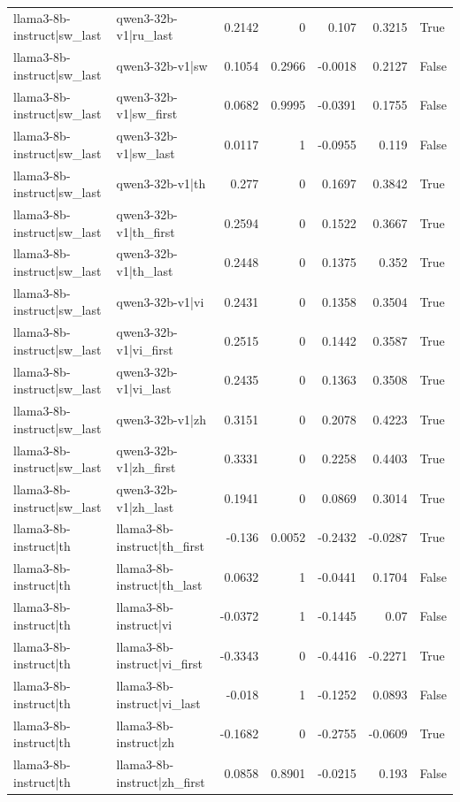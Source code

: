 \begin{table}
\begin{tabular}{l l r r r r l}
llama3-8b-instruct|sw_last & qwen3-32b-v1|ru_last & 0.2142 & 0 & 0.107 & 0.3215 & True \\
llama3-8b-instruct|sw_last & qwen3-32b-v1|sw & 0.1054 & 0.2966 & -0.0018 & 0.2127 & False \\
llama3-8b-instruct|sw_last & qwen3-32b-v1|sw_first & 0.0682 & 0.9995 & -0.0391 & 0.1755 & False \\
llama3-8b-instruct|sw_last & qwen3-32b-v1|sw_last & 0.0117 & 1 & -0.0955 & 0.119 & False \\
llama3-8b-instruct|sw_last & qwen3-32b-v1|th & 0.277 & 0 & 0.1697 & 0.3842 & True \\
llama3-8b-instruct|sw_last & qwen3-32b-v1|th_first & 0.2594 & 0 & 0.1522 & 0.3667 & True \\
llama3-8b-instruct|sw_last & qwen3-32b-v1|th_last & 0.2448 & 0 & 0.1375 & 0.352 & True \\
llama3-8b-instruct|sw_last & qwen3-32b-v1|vi & 0.2431 & 0 & 0.1358 & 0.3504 & True \\
llama3-8b-instruct|sw_last & qwen3-32b-v1|vi_first & 0.2515 & 0 & 0.1442 & 0.3587 & True \\
llama3-8b-instruct|sw_last & qwen3-32b-v1|vi_last & 0.2435 & 0 & 0.1363 & 0.3508 & True \\
llama3-8b-instruct|sw_last & qwen3-32b-v1|zh & 0.3151 & 0 & 0.2078 & 0.4223 & True \\
llama3-8b-instruct|sw_last & qwen3-32b-v1|zh_first & 0.3331 & 0 & 0.2258 & 0.4403 & True \\
llama3-8b-instruct|sw_last & qwen3-32b-v1|zh_last & 0.1941 & 0 & 0.0869 & 0.3014 & True \\
llama3-8b-instruct|th & llama3-8b-instruct|th_first & -0.136 & 0.0052 & -0.2432 & -0.0287 & True \\
llama3-8b-instruct|th & llama3-8b-instruct|th_last & 0.0632 & 1 & -0.0441 & 0.1704 & False \\
llama3-8b-instruct|th & llama3-8b-instruct|vi & -0.0372 & 1 & -0.1445 & 0.07 & False \\
llama3-8b-instruct|th & llama3-8b-instruct|vi_first & -0.3343 & 0 & -0.4416 & -0.2271 & True \\
llama3-8b-instruct|th & llama3-8b-instruct|vi_last & -0.018 & 1 & -0.1252 & 0.0893 & False \\
llama3-8b-instruct|th & llama3-8b-instruct|zh & -0.1682 & 0 & -0.2755 & -0.0609 & True \\
llama3-8b-instruct|th & llama3-8b-instruct|zh_first & 0.0858 & 0.8901 & -0.0215 & 0.193 & False \\

\end{tabular}
\end{table}
